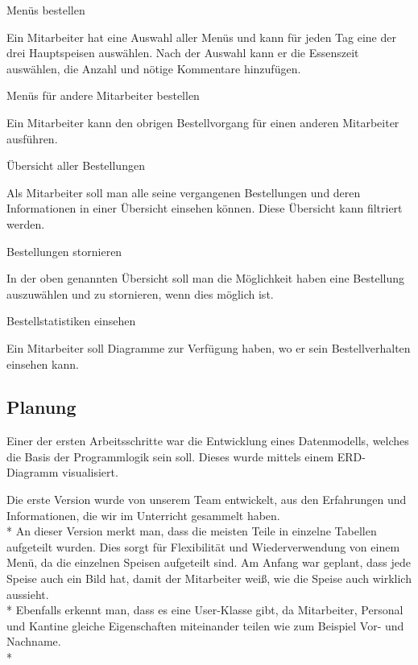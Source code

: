 \begin{compactitem}
    \item Menüs bestellen
    \begin{compactitem}
        \item Ein Mitarbeiter hat eine Auswahl aller Menüs und kann für jeden Tag eine der drei Hauptspeisen auswählen. Nach der Auswahl kann er die Essenszeit auswählen, die Anzahl und nötige Kommentare hinzufügen.
    \end{compactitem}
    \item Menüs für andere Mitarbeiter bestellen
    \begin{compactitem}
        \item Ein Mitarbeiter kann den obrigen Bestellvorgang für einen anderen Mitarbeiter ausführen. 
    \end{compactitem}
    \item Übersicht aller Bestellungen
    \begin{compactitem}
        \item Als Mitarbeiter soll man alle seine vergangenen Bestellungen und deren Informationen in einer Übersicht einsehen können. Diese Übersicht kann filtriert werden.
    \end{compactitem}
    \item Bestellungen stornieren
    \begin{compactitem}
        \item In der oben genannten Übersicht soll man die Möglichkeit haben eine Bestellung auszuwählen und zu stornieren, wenn dies möglich ist.
    \end{compactitem}
    \item Bestellstatistiken einsehen
    \begin{compactitem}
        \item Ein Mitarbeiter soll Diagramme zur Verfügung haben, wo er sein Bestellverhalten einsehen kann.
    \end{compactitem}
\end{compactitem}

\subsection{Planung}
\author{Benjamin Besic}
Einer der ersten Arbeitsschritte war die Entwicklung eines Datenmodells, welches die Basis der Programmlogik sein soll. Dieses wurde mittels einem ERD-Diagramm visualisiert.


Die erste Version wurde von unserem Team entwickelt, aus den Erfahrungen und Informationen, die wir im Unterricht gesammelt haben. \\*
An dieser Version merkt man, dass die meisten Teile in einzelne Tabellen aufgeteilt wurden. Dies sorgt für Flexibilität und Wiederverwendung von einem Menü, da die einzelnen
Speisen aufgeteilt sind.
Am Anfang war geplant, dass jede Speise auch ein Bild hat, damit der Mitarbeiter weiß, wie die Speise auch wirklich aussieht.\\*
Ebenfalls erkennt man, dass es eine User-Klasse gibt, da Mitarbeiter, Personal und Kantine gleiche Eigenschaften miteinander teilen wie zum Beispiel Vor- und Nachname.\\* \pagebreak


